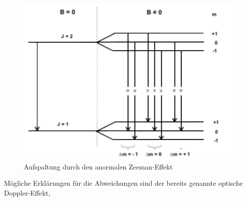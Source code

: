 \begin{figure}[h!]
  \centering
  \includegraphics[width=\textwidth]{anormal.png}
  \caption{Aufspaltung durch den anormalen Zeeman-Effekt \cite{1}}
  \label{fig:normal}
\end{figure}
\FloatBarrier
Mögliche Erklärungen für die Abweichungen sind der bereits genannte optische Doppler-Effekt, 
